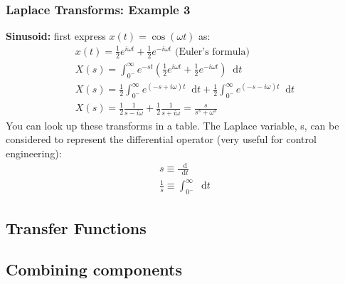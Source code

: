 \documentclass[class=report, crop=false, 12pt,a4paper, tikz, border=4mm]{standalone}
\newcommand{\dif}{\mathop{}\!\mathrm{d}}
\begin{document}
\subsubsection{Laplace Transforms: Example 3}
\textbf{Sinusoid:} first express $x(t) = \cos{(\omega t)}$ as:
\begin{gather}
  x(t) = \frac{1}{2} e^{i \omega t} + \frac{1}{2} e^{-i \omega t} \textrm{ (Euler's formula)}\\
  X(s) = \int_{0^-}^\infty e^{-st} \left( \frac{1}{2} e^{i \omega t} + \frac{1}{2} e^{-i \omega t} \right) \dif t\\
  X(s) = \frac{1}{2} \int_{0^-}^\infty e^{(-s + i \omega)t}\dif t + \frac{1}{2} \int_{0^-}^\infty e^{(-s - i \omega)t} \dif t\\
  X(s) = \frac{1}{2} \frac{1}{s - i \omega} + \frac{1}{2} \frac{1}{s + i \omega} = \frac{s}{s^s + \omega^s} 
\end{gather}
You can look up these transforms in a table. The Laplace variable, s, can be considered to represent the differential operator (very useful for control engineering):
\begin{gather}
  s \equiv \frac{\dif}{\dif t}\\
  \frac{1}{s} \equiv \int_{0^-}^\infty \dif t
\end{gather}
\subsection{Transfer Functions}
\subsection{Combining components}
\end{document}
